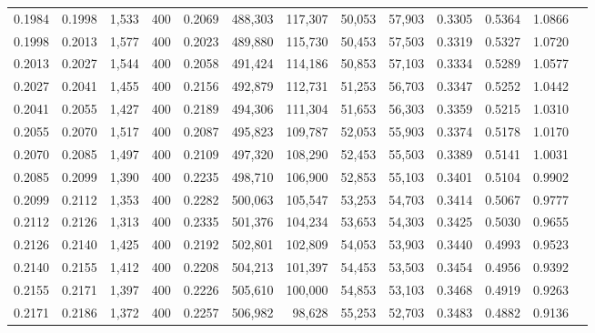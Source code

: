 \begin{tabular}{rrrrrrrrrrrrr}
0.1984 & 0.1998 &  1,533 & 400 &                                     0.2069 & 488,303 & 117,307 &  50,053 &  57,903 & 0.3305 & 0.5364 & 1.0866 \\
0.1998 & 0.2013 &  1,577 & 400 &                                     0.2023 & 489,880 & 115,730 &  50,453 &  57,503 & 0.3319 & 0.5327 & 1.0720 \\
0.2013 & 0.2027 &  1,544 & 400 &                                     0.2058 & 491,424 & 114,186 &  50,853 &  57,103 & 0.3334 & 0.5289 & 1.0577 \\
0.2027 & 0.2041 &  1,455 & 400 &                                     0.2156 & 492,879 & 112,731 &  51,253 &  56,703 & 0.3347 & 0.5252 & 1.0442 \\
0.2041 & 0.2055 &  1,427 & 400 &                                     0.2189 & 494,306 & 111,304 &  51,653 &  56,303 & 0.3359 & 0.5215 & 1.0310 \\
0.2055 & 0.2070 &  1,517 & 400 &                                     0.2087 & 495,823 & 109,787 &  52,053 &  55,903 & 0.3374 & 0.5178 & 1.0170 \\
0.2070 & 0.2085 &  1,497 & 400 &                                     0.2109 & 497,320 & 108,290 &  52,453 &  55,503 & 0.3389 & 0.5141 & 1.0031 \\
0.2085 & 0.2099 &  1,390 & 400 &                                     0.2235 & 498,710 & 106,900 &  52,853 &  55,103 & 0.3401 & 0.5104 & 0.9902 \\
0.2099 & 0.2112 &  1,353 & 400 &                                     0.2282 & 500,063 & 105,547 &  53,253 &  54,703 & 0.3414 & 0.5067 & 0.9777 \\
0.2112 & 0.2126 &  1,313 & 400 &                                     0.2335 & 501,376 & 104,234 &  53,653 &  54,303 & 0.3425 & 0.5030 & 0.9655 \\
0.2126 & 0.2140 &  1,425 & 400 &                                     0.2192 & 502,801 & 102,809 &  54,053 &  53,903 & 0.3440 & 0.4993 & 0.9523 \\
0.2140 & 0.2155 &  1,412 & 400 &                                     0.2208 & 504,213 & 101,397 &  54,453 &  53,503 & 0.3454 & 0.4956 & 0.9392 \\
0.2155 & 0.2171 &  1,397 & 400 &                                     0.2226 & 505,610 & 100,000 &  54,853 &  53,103 & 0.3468 & 0.4919 & 0.9263 \\
0.2171 & 0.2186 &  1,372 & 400 &                                     0.2257 & 506,982 &  98,628 &  55,253 &  52,703 & 0.3483 & 0.4882 & 0.9136 \\

\end{tabular}
